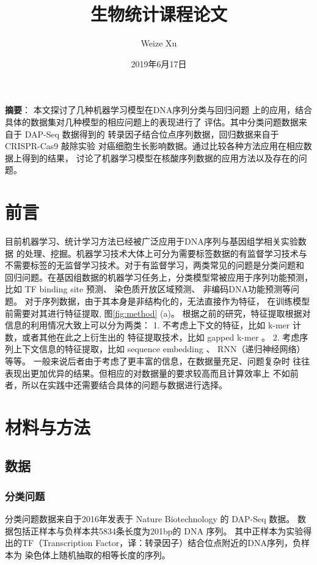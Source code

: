 \documentclass[UTF8]{ctexart}
\title{生物统计课程论文}
\author{Weize Xu}
\date{2019年6月17日}
\begin{document}
  \maketitle

  \textbf{摘要}：
  本文探讨了几种机器学习模型在DNA序列分类与回归问题
  上的应用，结合具体的数据集对几种模型的相应问题上的表现进行了
  评估。其中分类问题数据来自于 DAP-Seq 数据得到的
  转录因子结合位点序列数据，回归数据来自于 CRISPR-Cas9 敲除实验
  对癌细胞生长影响数据。通过比较各种方法应用在相应数据上得到的结果，
  讨论了机器学习模型在核酸序列数据的应用方法以及存在的问题。

  \section{前言}
  目前机器学习、统计学习方法已经被广泛应用于DNA序列与基因组学相关实验数据
  的处理、挖掘。机器学习技术大体上可分为需要标签数据的有监督学习技术与
  不需要标签的无监督学习技术。对于有监督学习，两类常见的问题是分类问题和
  回归问题。在基因组数据的机器学习任务上，分类模型常被应用于序列功能预测，
  比如 TF binding site 预测\autocite{ghandi2014enhanced,alipanahi2015predicting}、
  染色质开放区域预测\autocite{kelley2016basset}、
  非编码DNA功能预测\autocite{zhou2015predicting}等问题。
  对于序列数据，由于其本身是非结构化的，无法直接作为特征，
  在训练模型前需要对其进行特征提取, 图\ref{fig:method} (a)。
  根据之前的研究，特征提取根据对信息的利用情况大致上可以分为两类：
  1. 不考虑上下文的特征，比如 k-mer 计数，或者其他在此之上衍生出的
  特征提取技术，比如 gapped k-mer \autocite{ghandi2014enhanced}。
  2. 考虑序列上下文信息的特征提取，比如 sequence embedding \autocite{zeng2018prediction}、
  RNN（递归神经网络）\autocite{shen2018recurrent} 等等。
  一般来说后者由于考虑了更丰富的信息，在数据量充足、问题复杂时
  往往表现出更加优异的结果。但相应的对数据量的要求较高而且计算效率上
  不如前者，所以在实践中还需要结合具体的问题与数据进行选择。

  \section{材料与方法}
  \subsection{数据}
  \subsubsection{分类问题}
  分类问题数据来自于2016年发表于 Nature Biotechnology 的 DAP-Seq 数据\autocite{o2016cistrome}。
  数据包括正样本与负样本共5834条长度为201bp的 DNA 序列。
  其中正样本为实验得出的TF（Transcription Factor，译：转录因子）结合位点附近的DNA序列，负样本为
  染色体上随机抽取的相等长度的序列。
\end{document}
